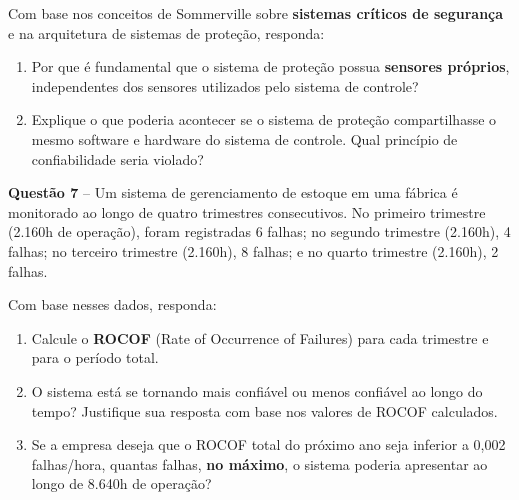 \documentclass[12pt,a4paper]{article}
\newcommand{\resposta}[1]{
\noindent
\framebox[\textwidth]{
\begin{minipage}{0.98\textwidth}
\vspace*{#1}\null
\end{minipage}
}
}
\begin{document}
\vspace{0.2cm}

Com base nos conceitos de Sommerville sobre \textbf{sistemas críticos de segurança} e na arquitetura de sistemas de proteção, responda:

\begin{enumerate}[label=\textbf{\alph*)}]
    \item Por que é fundamental que o sistema de proteção possua \textbf{sensores próprios}, independentes dos sensores utilizados pelo sistema de controle?
    \item Explique o que poderia acontecer se o sistema de proteção compartilhasse o mesmo software e hardware do sistema de controle. Qual princípio de confiabilidade seria violado?
\end{enumerate}

\vspace{0.2cm}
\resposta{6cm}

\vspace{0.5cm}

\textbf{Questão 7} -- Um sistema de gerenciamento de estoque em uma fábrica é monitorado ao longo de quatro trimestres consecutivos. No primeiro trimestre (2.160h de operação), foram registradas 6 falhas; no segundo trimestre (2.160h), 4 falhas; no terceiro trimestre (2.160h), 8 falhas; e no quarto trimestre (2.160h), 2 falhas.

\vspace{0.2cm}

Com base nesses dados, responda:

\begin{enumerate}[label=\textbf{\alph*)}]
    \item Calcule o \textbf{ROCOF} (Rate of Occurrence of Failures) para cada trimestre e para o período total.
    \item O sistema está se tornando mais confiável ou menos confiável ao longo do tempo? Justifique sua resposta com base nos valores de ROCOF calculados.
    \item Se a empresa deseja que o ROCOF total do próximo ano seja inferior a 0,002 falhas/hora, quantas falhas, \textbf{no máximo}, o sistema poderia apresentar ao longo de 8.640h de operação?
\end{enumerate}

\vspace{0.2cm}
\resposta{6cm}
\end{document}
